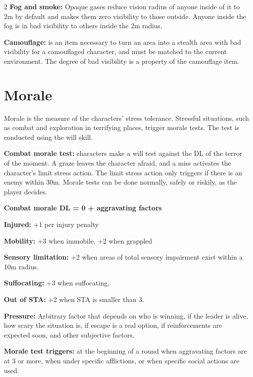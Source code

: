 \begin{multicols}{2}
\textbf{Fog and smoke:} Opaque gases reduce vision radius of anyone inside of it to 2m by default and makes them zero visibility to those outside. Anyone inside the fog is in bad visibility to others inside the 2m radius.

\textbf{Camouflage:} is an item necessary to turn an area into a stealth area with bad visibility for a camouflaged character, and must be matched to the current environment. The degree of bad visibility is a property of the camouflage item.


\section{Morale}

Morale is the measure of the characters' stress tolerance. Stressful situations, such as combat and exploration in terrifying places, trigger morale tests. The test is conducted using the will skill.

\textbf{Combat morale test:} characters make a will test against the DL of the terror of the moment. A graze leaves the character afraid, and a miss activates the character's limit stress action. The limit stress action only triggers if there is an enemy within 30m. Morale tests can be done normally, safely or riskily, as the player decides.

\textbf{Combat morale DL = 0 + aggravating factors}

\begin{proplist}
    \item \textbf{Injured:} +1 per injury penalty
    \item \textbf{Mobility:} +3 when immobile, +2 when grappled
    \item \textbf{Sensory limitation:} +2 when areas of total sensory impairment exist within a 10m radius.
    \item \textbf{Suffocating:} +3 when suffocating.
    \item \textbf{Out of STA:} +2 when STA is smaller than 3.
    \item \textbf{Pressure:} Arbitrary factor that depends on who is winning, if the leader is alive, how scary the situation is, if escape is a real option, if reinforcements are expected soon, and other subjective factors.
\end{proplist}

\textbf{Morale test triggers:} at the beginning of a round when aggravating factors are at 3 or more, when under specific afflictions, or when specific social actions are used.


\end{multicols}
